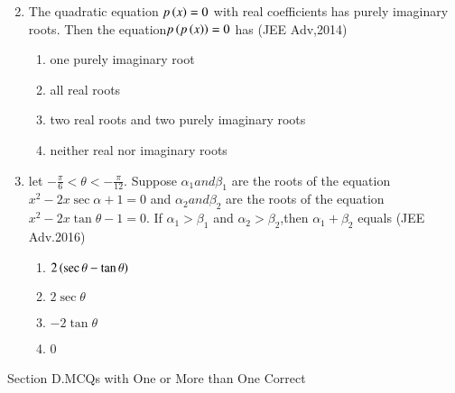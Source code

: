 \documentclass[journal,12pt,twocolumn]{IEEEtran}
\theoremstyle{remark}
\begin{document}
\begin{enumerate}[start=31]
\begin{multicols}{2}
\end{multicols}
\item The quadratic equation $p\left(x\right)=0$ with real coefficients has purely imaginary roots. Then the equation$p\left(p\left(x\right)\right)=0$ has \hfill (JEE Adv,2014)
\begin{enumerate}
    \item one purely imaginary root
    \item all real roots
    \item two real roots and two purely imaginary roots 
    \item neither real nor imaginary roots
\end{enumerate}
\item let $-\frac{\pi}{6}<\theta<-\frac{\pi}{12}$. Suppose $\alpha_{1}and\beta_{1}$ are the roots of the equation $x^{2}-2x\sec \alpha+1=0$ and $\alpha_{2}and\beta_{2}$ are the roots of the equation $x^{2}-2x\tan \theta-1=0$. If $\alpha_{1}>\beta_{1}$ and $\alpha_{2}>\beta_{2}$,then $\alpha_{1}+\beta_{2}$ equals \hfill (JEE Adv.2016)
\begin{enumerate}
    \item $2\left(\sec\theta-\tan\theta\right)$
    \item $2\sec\theta$
    \item $-2\tan\theta$
    \item 0
    
\end{enumerate}
\end{enumerate}
\maketitle\Large{Section D.MCQs with One or More than One Correct}
\end{document}
